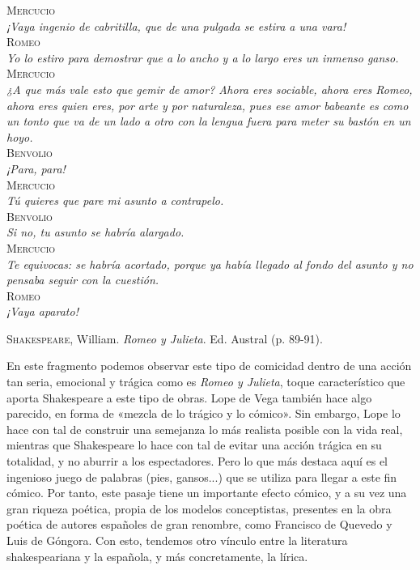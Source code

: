 \documentclass[12pt,a4paper]{article}
\begin{document}
\textsc{Mercucio}\\
\indent\textit{¡Vaya ingenio de cabritilla, que de una pulgada se estira a una vara!}\\
\textsc{Romeo}\\
\indent\textit{Yo lo estiro para demostrar que a lo ancho y a lo largo eres un inmenso ganso.}\\
\textsc{Mercucio}\\
\indent\textit{¿A que más vale esto que gemir de amor? Ahora eres sociable, ahora eres Romeo, ahora eres quien eres, por arte y por naturaleza, pues ese amor babeante es como un tonto que va de un lado a otro con la lengua fuera para meter su bastón en un hoyo.}\\
\textsc{Benvolio}\\
\indent\textit{¡Para, para!}\\
\textsc{Mercucio}\\
\indent\textit{Tú quieres que pare mi asunto a contrapelo.}\\
\textsc{Benvolio}\\
\indent\textit{Si no, tu asunto se habría alargado.}\\
\textsc{Mercucio}\\
\indent\textit{Te equivocas: se habría acortado, porque ya había llegado al fondo del asunto  y no pensaba seguir con la cuestión.}\\
\textsc{Romeo}\\
\indent\textit{¡Vaya aparato!}
\begin{flushright}
	\textsc{Shakespeare}, William. \textit{Romeo y Julieta}. Ed. Austral (p. 89-91).\\
\end{flushright}

En este fragmento podemos observar este tipo de comicidad dentro de una acción tan seria, emocional y trágica como es \textit{Romeo y Julieta}, toque característico que aporta Shakespeare a este tipo de obras. Lope de Vega también hace algo parecido, en forma de «mezcla de lo trágico y lo cómico». Sin embargo, Lope lo hace con tal de construir una semejanza lo más realista posible con la vida real, mientras que Shakespeare lo hace con tal de evitar una acción trágica en su totalidad, y no aburrir a los espectadores. Pero lo que más destaca aquí es el ingenioso juego de palabras (pies, gansos...) que se utiliza para llegar a este fin cómico. Por tanto, este pasaje tiene un importante efecto cómico, y a su vez una gran riqueza poética, propia de los modelos conceptistas, presentes en la obra poética de autores españoles de gran renombre, como Francisco de Quevedo y Luis de Góngora. Con esto, tendemos otro vínculo entre la literatura shakespeariana y la española, y más concretamente, la lírica.\\
\end{document}
